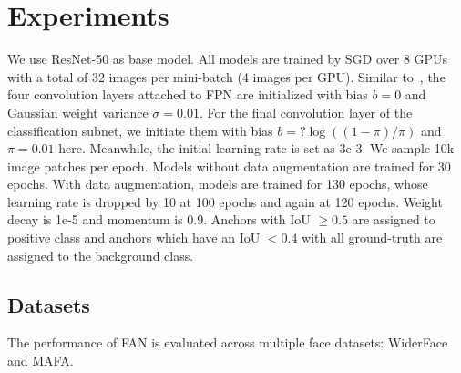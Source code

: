 \documentclass[10pt,twocolumn,letterpaper]{article}
\begin{document}
\section{Experiments}
We use ResNet-50 as base model. All models are trained by SGD over 8 GPUs with a total of 32 images per mini-batch (4 images per GPU). Similar to~\cite{lin2017focal}, the four convolution layers attached to FPN are initialized with bias $ b=0 $ and Gaussian weight variance $ \sigma=0.01 $. For the final convolution layer of the classification subnet, we initiate them with bias $ b=?\log((1-\pi)/\pi) $ and $ \pi=0.01 $ here. Meanwhile, the initial learning rate is set as 3e-3. We sample 10k image patches per epoch. Models without data augmentation are trained for 30 epochs. With data augmentation, models are trained for 130 epochs, whose learning rate is dropped by 10 at 100 epochs and again at 120 epochs. Weight decay is 1e-5 and momentum is 0.9. Anchors with IoU $ \geq0.5 $ are assigned to positive class and anchors which have an IoU $ <0.4 $ with all ground-truth are assigned to the background class.


\subsection{Datasets}
The performance of FAN is evaluated across multiple face datasets: WiderFace and MAFA.
\end{document}
